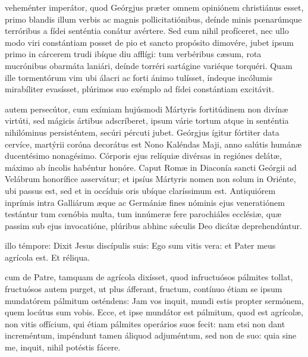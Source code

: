 \documentclass[fontsize=9pt,paper=A6,twoside,BCOR=1mm,DIV=22,headinclude]{scrarticle}
\begin{document}
\begin{multicols}{2}
{
 veheménter imperátor, quod Geórgjus præter omnem opiniónem christiánus esset, primo blandis illum verbis ac magnis pollicitatiónibus, deínde minis pœnarúmque terróribus a fídei senténtia conátur avértere. Sed cum nihil profíceret, nec ullo modo viri constántiam posset de pio et sancto propósito dimovére, jubet ipsum primo in cárcerem trudi ibíque diu afflígi: tum verbéribus cæsum, rota mucrónibus obarmáta laniári, deínde torréri sartágine variéque torquéri. Quam ille tormentórum vim ubi álacri ac forti ánimo tulísset, índeque incólumis mirabíliter evasísset, plúrimos suo exémplo ad fídei constántiam excitávit.

\RVMTPv 

}

 autem persecútor, cum exímiam hujúsmodi Mártyris fortitúdinem non divínæ virtúti, sed mágicis ártibus adscríberet, ipsum várie tortum atque in senténtia nihilóminus persisténtem, secúri pércuti jubet. Geórgjus ígitur fórtiter data cervíce, martýrii coróna decorátus est Nono Kaléndas Maji, anno salútis humánæ ducentésimo nonagésimo. Córporis ejus relíquiæ divérsas in regiónes delátæ, máximo ab íncolis habéntur honóre. Caput Romæ in Diaconía sancti Geórgii ad Velábrum honorífice asservátur; et ipsíus Mártyris nomen non solum in Oriénte, ubi passus est, sed et in occíduis oris ubíque claríssimum est. Antiquiórem inprímis intra Galliárum æque ac Germániæ fines nóminis ejus veneratiónem testántur tum cœnóbia multa, tum innúmeræ fere parochiáles ecclésiæ, quæ passim sub ejus invocatióne, plúribus abhinc s\'æculis Deo dicátæ deprehendúntur.

\RVMTPvi 

 illo témpore: 
Dixit Jesus discípulis suis:
Ego sum vitis vera: et Pater meus agrícola est.
Et réliqua.

 cum de Patre, tamquam de agrícola dixísset, quod infructuósos pálmites tollat, fructuósos autem purget, ut plus áfferant, fructum, contínuo étiam se ipsum mundatórem pálmitum osténdens: Jam vos inquit, mundi estis propter sermónem, quem locútus sum vobis. Ecce, et ipse mundátor est pálmitum, quod est agrícolæ, non vitis offícium, qui étiam pálmites operários suos fecit: nam etsi non dant increméntum, impéndunt tamen áliquod adjuméntum, sed non de suo: quia sine me, inquit, nihil potéstis fácere.


\end{multicols}
\end{document}
